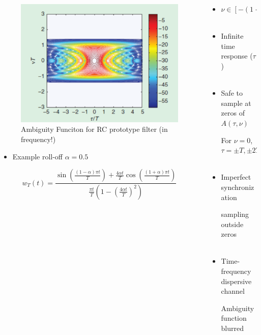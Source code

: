 \documentclass[xcolor=dvipsnames,aspectratio=169]{beamer}
\begin{document}
{\begin{columns}
 \begin{column}{6cm}
    \begin{figure}
    \centering
    \caption{Ambiguity Funciton for RC prototype filter (in frequency!)}
    \includegraphics[width=0.85\columnwidth]{rc-ambiguity.png}
    \end{figure}
 \begin{itemize}
\item Example roll-off $\alpha=0.5$
\end{itemize}
\begin{equation*}
    w_T(t) = \frac{\sin \left( \frac{(1-\alpha) \pi t}{T} \right) + \frac{4 \alpha t}{T} \cos \left(  \frac{(1+\alpha)\pi t}{T} \right)}{\frac{\pi t}{T} \left( 1- \left(\frac{4 \alpha t}{T} \right)^2 \right)}
\end{equation*}
 \end{column}
 \begin{column}{7cm}
 \begin{itemize}
\item $\nu \in [-(1+\alpha)/T, (1+\alpha)/T]$\\ \ \\
\item Infinite time response ($\tau$)\\ \ \\
\item Safe to sample at zeros of $A(\tau,\nu)$
    \begin{itemize}
    \itempro For $\nu=0$, $\tau= \pm T, \pm 2T, \cdots$\\ \ \\
    \end{itemize}
\item Imperfect synchronization
    \begin{itemize}
        \itemcontra sampling outside zeros\\ \ \\
    \end{itemize}
 \item Time-frequency dispersive channel
    \begin{itemize}
        \itemcontra Ambiguity function blurred
    \end{itemize}
\end{itemize}
 \end{column}
\end{columns}
}
\end{document}
